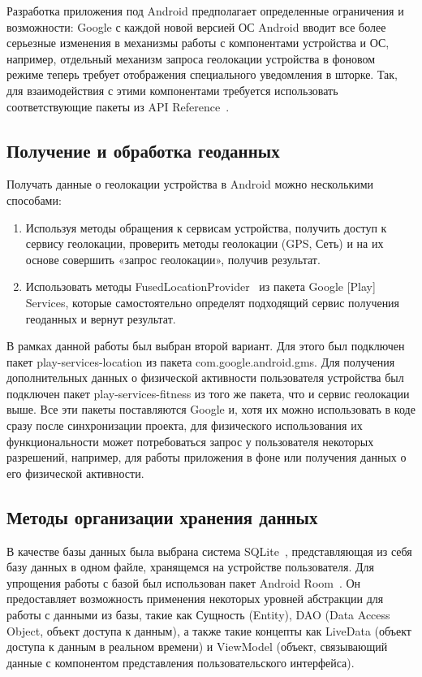 Разработка приложения под Android предполагает определенные ограничения и возможности: Google с каждой новой версией ОС Android вводит все более серьезные изменения в механизмы работы с компонентами устройства и ОС, например, отдельный механизм запроса геолокации устройства в фоновом режиме теперь требует отображения специального уведомления в шторке.
Так, для взаимодействия с этими компонентами требуется использовать соответствующие пакеты из API Reference~\autocite{android_api}.


\subsection*{Получение и обработка геоданных}
\label{subsec:geodata}
Получать данные о геолокации устройства в Android можно несколькими способами:
\begin{enumerate}
	\item Используя методы обращения к сервисам устройства, получить доступ к сервису геолокации, проверить методы геолокации (GPS, Сеть) и на их основе совершить «запрос геолокации», получив результат.
	\item Использовать методы FusedLocationProvider~\autocite{android_fused_location_provider} из пакета Google [Play] Services, которые самостоятельно определят подходящий сервис получения геоданных и вернут результат.
\end{enumerate}

В рамках данной работы был выбран второй вариант. Для этого был подключен пакет play-services-location из пакета com.google.android.gms.
Для получения дополнительных данных о физической активности пользователя устройства был подключен пакет play-services-fitness из того же пакета, что и сервис геолокации выше.
Все эти пакеты поставляются Google и, хотя их можно использовать в коде сразу после синхронизации проекта, для физического использования их функциональности может потребоваться запрос у пользователя некоторых разрешений, например, для работы приложения в фоне или получения данных о его физической активности.


\subsection*{Методы организации хранения данных}
В качестве базы данных была выбрана система SQLite~\autocite{sqlite}, представляющая из себя базу данных в одном файле, хранящемся на устройстве пользователя.
Для упрощения работы с базой был использован пакет Android Room~\autocite{android_room}. Он предоставляет возможность применения некоторых уровней абстракции для работы с данными из базы, такие как Сущность (Entity), DAO (Data Access Object, объект доступа к данным), а также такие концепты как LiveData (объект доступа к данным в реальном времени) и ViewModel (объект, связывающий данные с компонентом представления пользовательского интерфейса).


